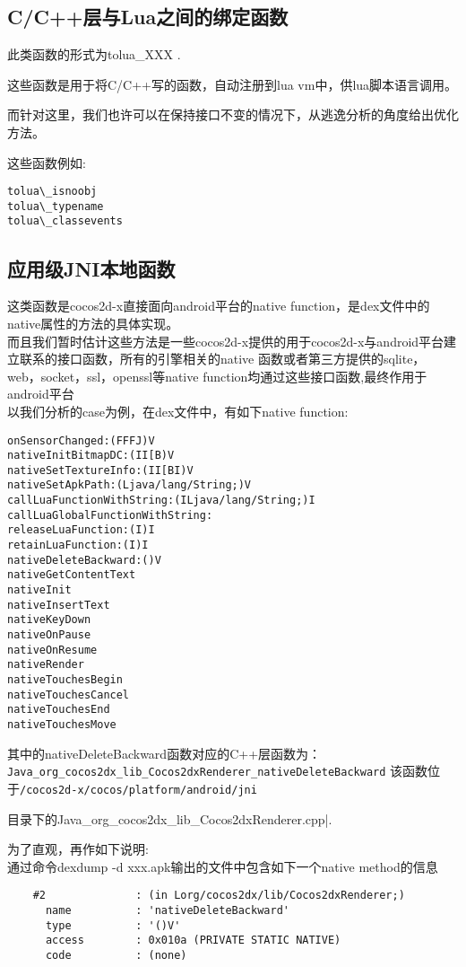 \subsection{C/C++层与Lua之间的绑定函数}
\label{sec:so:bindlib}
此类函数的形式为tolua\_XXX .

这些函数是用于将C/C++写的函数，自动注册到lua vm中，供lua脚本语言调用。

而针对这里，我们也许可以在保持接口不变的情况下，从逃逸分析的角度给出优化方法。

这些函数例如:\\
\begin{lstlisting}
tolua\_isnoobj
tolua\_typename
tolua\_classevents
\end{lstlisting}

\subsection{应用级JNI本地函数}
\label{sec:so:appjnilib}
这类函数是cocos2d-x直接面向android平台的native function，是dex文件中的native属性的方法的具体实现。\\
而且我们暂时估计这些方法是一些cocos2d-x提供的用于cocos2d-x与android平台建立联系的接口函数，所有的引擎相关的native 函数或者第三方提供的sqlite，web，socket，ssl，openssl等native function均通过这些接口函数,最终作用于android平台\\

以我们分析的case为例，在dex文件中，有如下native function:\\
\begin{lstlisting}
onSensorChanged:(FFFJ)V
nativeInitBitmapDC:(II[B)V
nativeSetTextureInfo:(II[BI)V
nativeSetApkPath:(Ljava/lang/String;)V
callLuaFunctionWithString:(ILjava/lang/String;)I
callLuaGlobalFunctionWithString:
releaseLuaFunction:(I)I
retainLuaFunction:(I)I
nativeDeleteBackward:()V
nativeGetContentText
nativeInit
nativeInsertText
nativeKeyDown
nativeOnPause
nativeOnResume
nativeRender
nativeTouchesBegin
nativeTouchesCancel
nativeTouchesEnd
nativeTouchesMove
\end{lstlisting}

其中的nativeDeleteBackward函数对应的C++层函数为：\\
\verb|Java_org_cocos2dx_lib_Cocos2dxRenderer_nativeDeleteBackward|
该函数位于\verb|/cocos2d-x/cocos/platform/android/jni|

目录下的Java\_org\_cocos2dx\_lib\_Cocos2dxRenderer.cpp|.

为了直观，再作如下说明:\\
通过命令dexdump -d xxx.apk输出的文件中包含如下一个native method的信息\\
\begin{lstlisting}
    #2              : (in Lorg/cocos2dx/lib/Cocos2dxRenderer;)
      name          : 'nativeDeleteBackward'
      type          : '()V'
      access        : 0x010a (PRIVATE STATIC NATIVE)
      code          : (none)
\end{lstlisting}

